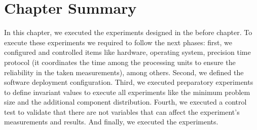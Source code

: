 \section{Chapter Summary}
In this chapter, we executed the experiments designed in the before chapter. To execute these experiments we required to follow the next phases: first, we configured and controlled items like hardware, operating system, precision time protocol (it coordinates the time among the processing units to ensure the reliability in the taken measurements), among others. Second, we defined the software deployment configuration. Third, we executed preparatory experiments to define invariant values to execute all experiments like the minimum problem size and the additional component distribution. Fourth, we executed a control test to validate that there are not variables that can affect the experiment's measurements and results. And finally, we executed the experiments.








